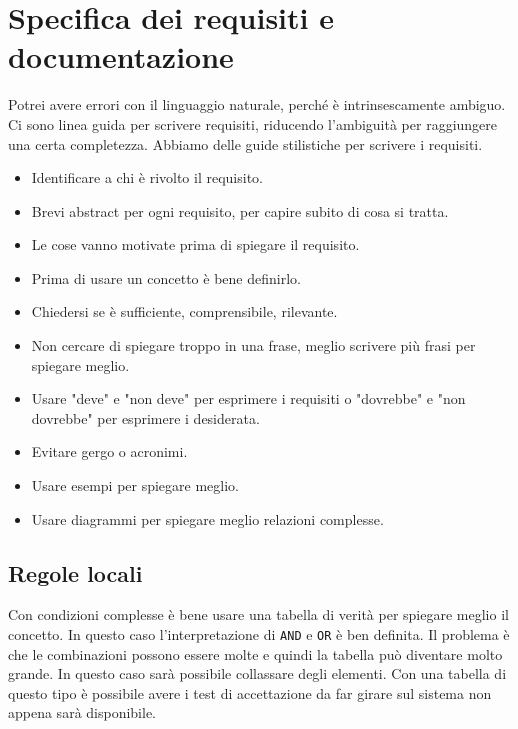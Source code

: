 \chapter{Specifica dei requisiti e documentazione}
Potrei avere errori con il linguaggio naturale, 
perché è intrinsescamente ambiguo.
Ci sono linea guida per scrivere requisiti,
riducendo l'ambiguità per raggiungere una certa completezza.
Abbiamo delle guide stilistiche per scrivere i requisiti.
\begin{itemize}
    \item Identificare a chi è rivolto il requisito.
    \item Brevi abstract per ogni requisito, per capire subito di cosa si tratta.
    \item Le cose vanno motivate prima di spiegare il requisito.
    \item Prima di usare un concetto è bene definirlo.
    \item Chiedersi se è sufficiente, comprensibile, rilevante.
    \item Non cercare di spiegare troppo in una frase, meglio 
    scrivere più frasi per spiegare meglio.
    \item Usare "deve" e "non deve" per esprimere i requisiti o 
    "dovrebbe" e "non dovrebbe" per esprimere i desiderata.
    \item Evitare gergo o acronimi.
    \item Usare esempi per spiegare meglio.
    \item Usare diagrammi per spiegare meglio relazioni 
    complesse.
\end{itemize}
\section{Regole locali}
Con condizioni complesse è bene usare 
una tabella di verità per spiegare meglio il concetto.
In questo caso l'interpretazione di \texttt{AND} 
e \texttt{OR} è ben definita. Il problema è che le combinazioni 
possono essere molte e quindi la tabella può diventare molto grande.
In questo caso sarà possibile collassare degli elementi.
Con una tabella di questo tipo è possibile avere i test 
di accettazione da far girare sul sistema non appena sarà
disponibile.

